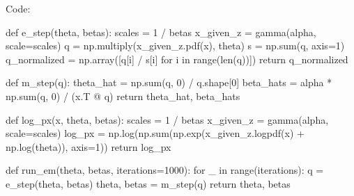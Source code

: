 \documentclass[submit]{harvardml}
\begin{document}
\begin{enumerate}
    Code:

    \begin{python}
def e_step(theta, betas):
    scales = 1 / betas
    x_given_z = gamma(alpha, scale=scales)
    q = np.multiply(x_given_z.pdf(x), theta) 
    s = np.sum(q, axis=1)
    q_normalized = np.array([q[i] / s[i] for i in range(len(q))])
    return q_normalized


def m_step(q):
    theta_hat = np.sum(q, 0) / q.shape[0]
    beta_hats = alpha * np.sum(q, 0) / (x.T @ q)
    return theta_hat, beta_hats


def log_px(x, theta, betas):
    scales = 1 / betas
    x_given_z = gamma(alpha, scale=scales)
    log_px = np.log(np.sum(np.exp(x_given_z.logpdf(x) + np.log(theta)), axis=1))
    return log_px


def run_em(theta, betas, iterations=1000):
    for _ in range(iterations):
        q = e_step(theta, betas)
        theta, betas = m_step(q)
    return theta, betas
    \end{python}
\end{enumerate}


\newpage
\end{document}
